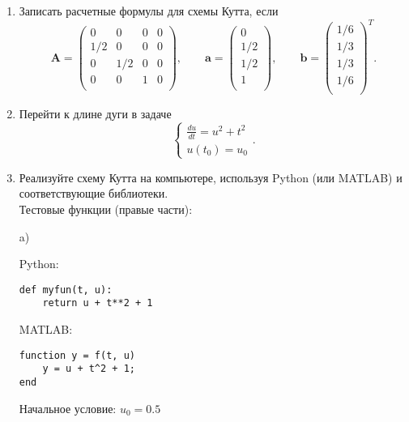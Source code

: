 \begin{enumerate}
\item Записать расчетные формулы для схемы Кутта, если
\begin{equation} \label{c2eq4}
	\mathbf{A} = 
		\begin{pmatrix}
		0 & 0 & 0 & 0 \\
		1/2 & 0 & 0 & 0 \\
		0 & 1/2 & 0 & 0 \\
		0 & 0 & 1 & 0 \\
		\end{pmatrix},
	\qquad
	\mathbf{a} = 
		\begin{pmatrix}
		0 \\
		1/2 \\
		1/2 \\
		1 \\
		\end{pmatrix},
	\qquad
	\mathbf{b} = 
		\begin{pmatrix}
		1/6 \\
		1/3 \\
		1/3 \\
		1/6 \\
		\end{pmatrix}^T.
\end{equation}
\item Перейти к длине дуги в задаче
\begin{equation} \label{c2eq5}
	\begin{cases}
		\displaystyle \frac{du}{dt} = u^2 + t^2 \\
		u(t_0) = u_0
	\end{cases}.
\end{equation}
\item Реализуйте схему Кутта на компьютере, используя Python (или MATLAB) и соответствующие библиотеки.\\
Тестовые функции (правые части):

a)  

Python:
\begin{verbatim}
def myfun(t, u):
    return u + t**2 + 1
\end{verbatim}

MATLAB:
\begin{matlablisting}
	\begin{Verbatim}
function y = f(t, u)
    y = u + t^2 + 1;
end
	\end{Verbatim}
\end{matlablisting}
Начальное условие: $u_0 = 0.5$


\end{enumerate}
